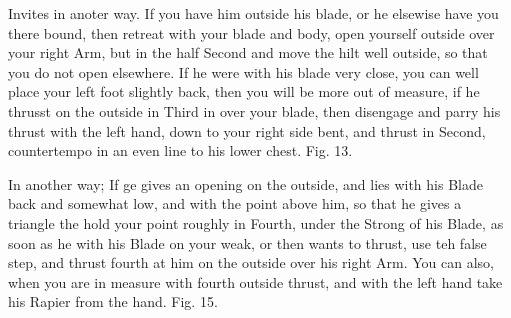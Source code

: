 
Invites in anoter way. If you have him outside his blade, or he
elsewise have you there bound, then retreat with your blade and body,
open yourself outside over your right Arm, but in the half Second and
move the hilt well outside, so that you do not open elsewhere. If he
were with his blade very close, you can well place your left foot
slightly back, then you will be more out of measure, if he thrusst on
the outside in Third in over your blade, then disengage and parry his
thrust with the left hand, down to your right side bent, and thrust in
Second, countertempo in an even line to his lower chest. Fig. 13.

\exercise{}


In another way; If ge gives an opening on the outside, and lies with
his Blade back and somewhat low, and with the point above him, so that
he gives a triangle the hold your point roughly in Fourth, under the
Strong of his Blade, as soon as he with his Blade on your weak, or
then wants to thrust, use teh false step, and thrust fourth at him on
the outside over his right Arm. You can also, when you are in measure
with fourth outside thrust, and with the left hand take his Rapier
from the hand. Fig. 15.


